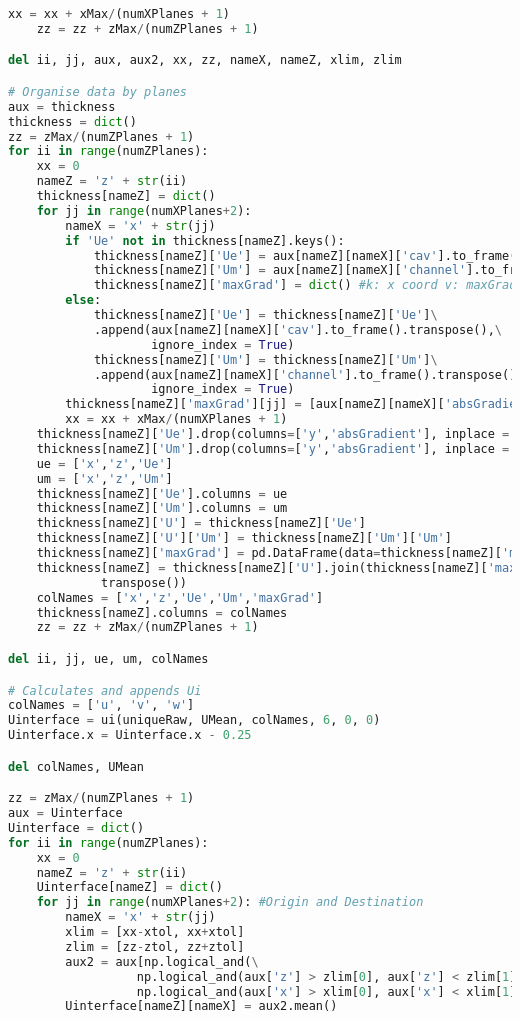 \begin{lstlisting}[language=python]
        xx = xx + xMax/(numXPlanes + 1)
    zz = zz + zMax/(numZPlanes + 1)

del ii, jj, aux, aux2, xx, zz, nameX, nameZ, xlim, zlim                   

# Organise data by planes
aux = thickness
thickness = dict()
zz = zMax/(numZPlanes + 1)
for ii in range(numZPlanes):
    xx = 0
    nameZ = 'z' + str(ii)
    thickness[nameZ] = dict()
    for jj in range(numXPlanes+2):
        nameX = 'x' + str(jj)
        if 'Ue' not in thickness[nameZ].keys():
            thickness[nameZ]['Ue'] = aux[nameZ][nameX]['cav'].to_frame().transpose()
            thickness[nameZ]['Um'] = aux[nameZ][nameX]['channel'].to_frame().transpose()
            thickness[nameZ]['maxGrad'] = dict() #k: x coord v: maxGrad
        else:
            thickness[nameZ]['Ue'] = thickness[nameZ]['Ue']\
            .append(aux[nameZ][nameX]['cav'].to_frame().transpose(),\
                    ignore_index = True)
            thickness[nameZ]['Um'] = thickness[nameZ]['Um']\
            .append(aux[nameZ][nameX]['channel'].to_frame().transpose(),\
                    ignore_index = True)
        thickness[nameZ]['maxGrad'][jj] = [aux[nameZ][nameX]['absGradient']]
        xx = xx + xMax/(numXPlanes + 1)
    thickness[nameZ]['Ue'].drop(columns=['y','absGradient'], inplace = True)
    thickness[nameZ]['Um'].drop(columns=['y','absGradient'], inplace = True)
    ue = ['x','z','Ue']
    um = ['x','z','Um']
    thickness[nameZ]['Ue'].columns = ue
    thickness[nameZ]['Um'].columns = um
    thickness[nameZ]['U'] = thickness[nameZ]['Ue']
    thickness[nameZ]['U']['Um'] = thickness[nameZ]['Um']['Um']
    thickness[nameZ]['maxGrad'] = pd.DataFrame(data=thickness[nameZ]['maxGrad'])
    thickness[nameZ] = thickness[nameZ]['U'].join(thickness[nameZ]['maxGrad'].\
             transpose())
    colNames = ['x','z','Ue','Um','maxGrad']
    thickness[nameZ].columns = colNames
    zz = zz + zMax/(numZPlanes + 1)

del ii, jj, ue, um, colNames  

# Calculates and appends Ui
colNames = ['u', 'v', 'w']
Uinterface = ui(uniqueRaw, UMean, colNames, 6, 0, 0)
Uinterface.x = Uinterface.x - 0.25

del colNames, UMean

zz = zMax/(numZPlanes + 1)
aux = Uinterface
Uinterface = dict()
for ii in range(numZPlanes):
    xx = 0
    nameZ = 'z' + str(ii)
    Uinterface[nameZ] = dict()
    for jj in range(numXPlanes+2): #Origin and Destination
        nameX = 'x' + str(jj)
        xlim = [xx-xtol, xx+xtol]
        zlim = [zz-ztol, zz+ztol]
        aux2 = aux[np.logical_and(\
                  np.logical_and(aux['z'] > zlim[0], aux['z'] < zlim[1]),\
                  np.logical_and(aux['x'] > xlim[0], aux['x'] < xlim[1]))]
        Uinterface[nameZ][nameX] = aux2.mean()


\end{lstlisting}
